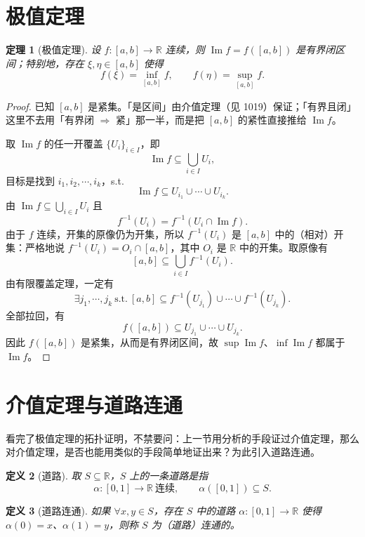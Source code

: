 \documentclass[UTF8,11pt]{ctexart}
\theoremstyle{cnthm}
\newtheorem{thm}{定理}[section]
\newtheorem{defn}[thm]{定义}
\begin{document}
\section{极值定理}

\begin{thm}[极值定理]
设 $f:[a,b]\to\mathbb{R}$ 连续，则 $\operatorname{Im}f=f([a,b])$ 是有界闭区间；特别地，存在 $\xi,\eta\in[a,b]$ 使得
\[
f(\xi)=\inf_{[a,b]}f,\qquad f(\eta)=\sup_{[a,b]}f.
\]
\end{thm}

\begin{proof}
已知 $[a,b]$ 是紧集。「是区间」由介值定理（见 1019）保证；「有界且闭」这里不去用「有界闭 $\Rightarrow$ 紧」那一半，而是把 $[a,b]$ 的紧性直接推给 $\operatorname{Im}f$。

取 $\operatorname{Im}f$ 的任一开覆盖 $\{U_i\}_{i\in I}$，即
\[
\operatorname{Im}f\subseteq\bigcup_{i\in I}U_i,
\]
目标是找到 $i_1,i_2,\cdots,i_k$，s.t.
\[
\operatorname{Im}f\subseteq U_{i_1}\cup\cdots\cup U_{i_k}.
\]
由 $\operatorname{Im}f\subseteq\bigcup\limits_{i\in I}U_i$ 且
\[
f^{-1}(U_i)=f^{-1}(U_i\cap\operatorname{Im}f).
\]
由于 $f$ 连续，开集的原像仍为开集，所以 $f^{-1}(U_i)$ 是 $[a,b]$ 中的（相对）开集：严格地说 $f^{-1}(U_i)=O_i\cap[a,b]$，其中 $O_i$ 是 $\mathbb{R}$ 中的开集。取原像有
\[
[a,b]\subseteq\bigcup_{i\in I}f^{-1}(U_i).
\]
由有限覆盖定理，一定有
\[
\exists j_1,\cdots,j_k\ \text{s.t.}\
[a,b]\subseteq f^{-1}(U_{j_1})\cup\cdots\cup f^{-1}(U_{j_k}).
\]
全部拉回，有
\[
f([a,b])\subseteq U_{j_1}\cup\cdots\cup U_{j_k}.
\]
因此 $f([a,b])$ 是紧集，从而是有界闭区间，故 $\sup\operatorname{Im}f$、$\inf\operatorname{Im}f$ 都属于 $\operatorname{Im}f$。
\end{proof}

\section{介值定理与道路连通}

看完了极值定理的拓扑证明，不禁要问：上一节用分析的手段证过介值定理，那么对介值定理，是否也能用类似的手段简单地证出来？为此引入道路连通。

\begin{defn}[道路]
取 $S\subseteq\mathbb{R}$，$S$ 上的一条道路是指
\[
\alpha:[0,1]\to\mathbb{R}\ \text{连续},\qquad \alpha([0,1])\subseteq S.
\]
\end{defn}

\begin{defn}[道路连通]
如果 $\forall x,y\in S$，存在 $S$ 中的道路 $\alpha:[0,1]\to\mathbb{R}$ 使得 $\alpha(0)=x$、$\alpha(1)=y$，则称 $S$ 为（道路）连通的。
\end{defn}
\end{document}
